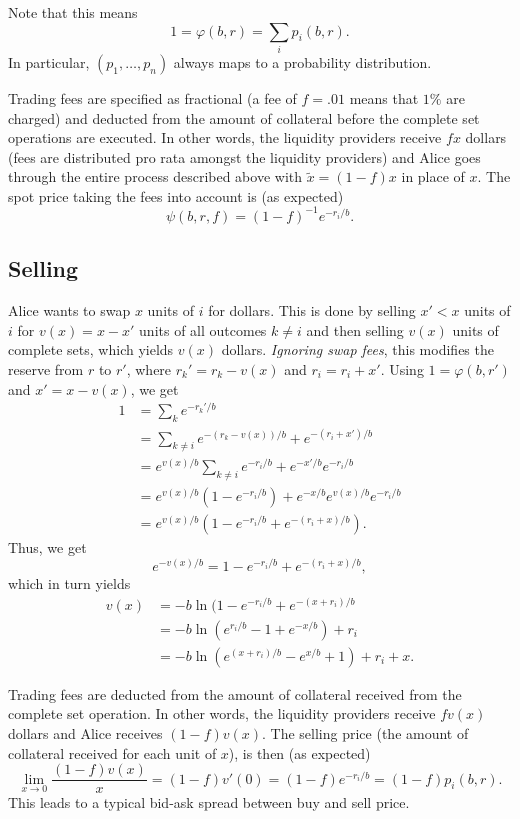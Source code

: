 \documentclass[12pt]{article}
\begin{document}
Note that this means
\[
    1 = \varphi(b, r) = \sum_i p_i(b, r).
\]
In particular, $(p_1, \ldots, p_n)$ always maps to a probability distribution.

Trading fees are specified as fractional (a fee of $f = .01$ means that $1\%$ are charged) and deducted from the amount of collateral before the complete set operations are executed. In other words, the liquidity providers receive $fx$ dollars (fees are distributed pro rata amongst the liquidity providers) and Alice goes through the entire process described above with $\tilde x = (1-f)x$ in place of $x$. The spot price taking the fees into account is (as expected)
\[
    \psi(b, r, f) = (1 - f)^{-1}e^{-r_i/b}.
\]

\subsection{Selling}

Alice wants to swap $x$ units of $i$ for dollars. This is done by selling $x' < x$ units of $i$ for $v(x) = x - x'$ units of all outcomes $k \neq i$ and then selling $v(x)$ units of complete sets, which yields $v(x)$ dollars. \emph{Ignoring swap fees}, this modifies the reserve from $r$ to $r'$, where $r_k' = r_k - v(x)$ and $r_i = r_i + x'$. Using $1 = \varphi(b, r')$ and $x' = x - v(x)$, we get
\begin{align*}
    1 &= \sum_k e^{-r_k'/b} \\
    &= \sum_{k \neq i} e^{-(r_k - v(x))/b} + e^{-(r_i + x')/b} \\
    &= e^{v(x)/b} \sum_{k \neq i} e^{-r_i/b} + e^{-x'/b} e^{-r_i/b} \\
    &= e^{v(x)/b} (1 - e^{-r_i/b}) + e^{-x/b} e^{v(x)/b} e^{-r_i/b} \\
    &= e^{v(x)/b} ( 1 - e^{-r_i/b} + e^{-(r_i + x)/b} ).
\end{align*}
Thus, we get
$$
    e^{-v(x)/b} = 1 - e^{-r_i/b} + e^{-(r_i + x)/b},
$$
which in turn yields                                                                                   \begin{align*}
    v(x) &= - b \ln (1 - e^{-r_i/b} + e^{-(x+r_i)/b} \\
    &= -b \ln (e^{r_i/b} - 1 + e^{-x/b}) + r_i \\                                                          &= -b \ln (e^{(x + r_i)/b} - e^{x/b} + 1) + r_i + x.
\end{align*}

Trading fees are deducted from the amount of collateral received from the complete set operation. In other words, the liquidity providers receive $fv(x)$ dollars and Alice receives $(1-f)v(x)$. The selling price (the amount of collateral received for each unit of $x$), is then (as expected)
\[
    \lim_{x \rightarrow 0} \frac{(1-f)v(x)}{x} = (1-f) v'(0) = (1-f) e^{-r_i/b} = (1-f)p_i(b, r).
\]
This leads to a typical bid-ask spread between buy and sell price.
\end{document}
